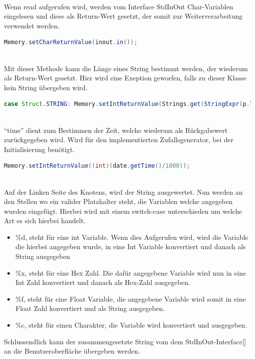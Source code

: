 \\
Wenn read aufgerufen wird, werden vom Interface StdInOut Char-Variablen eingelesen und diese als Return-Wert gesetzt, der somit zur Weiterverarbeitung verwendet werden.
\begin{lstlisting}[language=JAVA]
Memory.setCharReturnValue(inout.in());
\end{lstlisting}

\\
Mit dieser Methode kann die Länge eines String bestimmt werden, der wiederum als Return-Wert gesetzt. Hier wird eine Exeption geworfen, falls zu dieser Klasse kein String übergeben wird.
\begin{lstlisting}[language=JAVA]
case Struct.STRING:	Memory.setIntReturnValue(Strings.get(StringExpr(p.left)).length());
\end{lstlisting}

\\
``time'' dient zum Bestimmen der Zeit, welche wiederum als Rückgabewert zurückgegeben wird. Wird für den implementierten Zufallsgenerator, bei der Initialisierung benötigt.
\begin{lstlisting}[language=JAVA]
Memory.setIntReturnValue((int)(date.getTime()/1000));
\end{lstlisting}

\\
Auf der Linken Seite des Knotens, wird der String ausgewertet. Nun werden an den Stellen wo ein valider Platzhalter steht, die Variablen welche angegeben wurden eingefügt. Hierbei wird mit einem switch-case unterschieden um welche Art es sich hierbei handelt.
\begin{itemize}
\item \%d, steht für eine int Variable. Wenn dies Aufgerufen wird, wird die Variable die hierbei angegeben wurde, in eine Int Variable konvertiert und danach als String ausgegeben
\item \%x, steht für eine Hex Zahl. Die dafür angegebene Variable wird nun in eine Int Zahl konvertiert und danach als Hex-Zahl ausgegeben.
\item \%f, steht für eine Float Variable, die angegebene Variable wird somit in eine Float Zahl konvertiert und als String ausgegeben.
\item \%c, steht für einen Charakter, die Variable wird konvertiert und ausgegeben. 
\end{itemize}
Schlussendlich kann der zusammengesetzte String vom dem StdInOut-Interface\ref{} an die Benutzeroberfläche übergeben werden.


